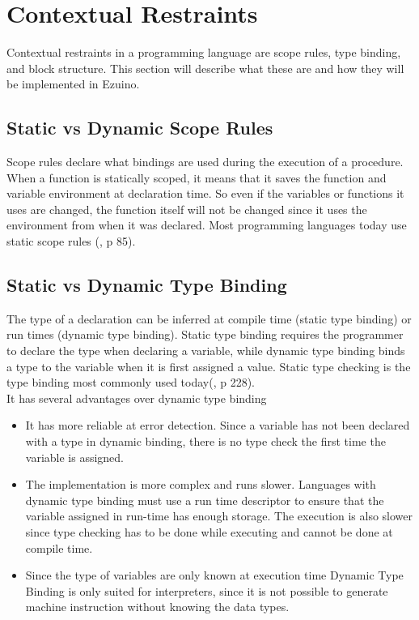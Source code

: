 \section{Contextual Restraints}
Contextual restraints in a programming language are scope rules, type binding, and block structure. This section will describe what these are and how they will be implemented in Ezuino.
\subsection{Static vs Dynamic Scope Rules}
Scope rules declare what bindings are used during the execution of a procedure.
When a function is statically scoped, it means that it saves the function and variable environment at declaration time. So even if the variables or functions it uses are changed, the function itself will not be changed since it uses the environment from when it was declared. Most programming languages today use static scope rules (\cite{syntax-and-semantics}, p 85). 
\subsection{Static vs Dynamic Type Binding}
The type of a declaration can be inferred at compile time (static type binding) or run times (dynamic type binding). Static type binding requires the programmer to declare the type when declaring a variable, while dynamic type binding binds a type to the variable when it is first assigned a value. Static type checking is the type binding most commonly used today(\cite{conceptsOfProgrammingLanguages}, p 228). \\ 
It has several advantages over dynamic type binding
\begin{itemize}
    \item It has more reliable at error detection. Since a variable has not been declared with a type in dynamic binding, there is no type check the first time the variable is assigned.
    \item The implementation is more complex and runs slower. Languages with dynamic type binding must use a run time descriptor to ensure that the variable assigned in run-time has enough storage.
    The execution is also slower since type checking has to be done while executing and cannot be done at compile time.
    \item Since the type of variables are only known at execution time Dynamic Type Binding is only suited for interpreters, since it is not possible to generate machine instruction without knowing the data types.
\end{itemize}

